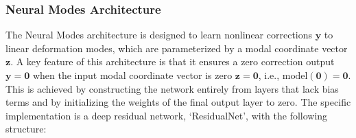 \subsubsection{Neural Modes Architecture}
The Neural Modes architecture is designed to learn nonlinear corrections \( \bm{y} \) to linear deformation modes, which are parameterized by a modal coordinate vector \( \bm{z} \). A key feature of this architecture is that it ensures a zero correction output \( \bm{y}=\bm{0} \) when the input modal coordinate vector is zero \( \bm{z}=\bm{0} \), i.e., \( \text{model}(\bm{0}) = \bm{0} \). This is achieved by constructing the network entirely from layers that lack bias terms and by initializing the weights of the final output layer to zero. The specific implementation is a deep residual network, `ResidualNet', with the following structure:

